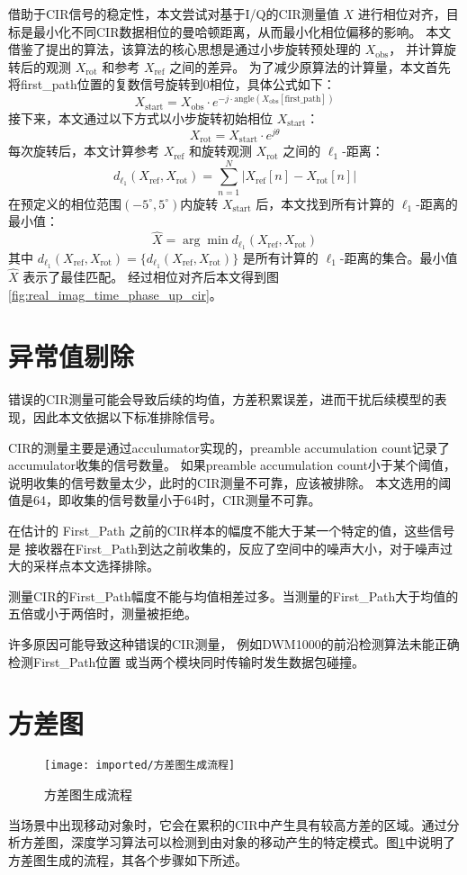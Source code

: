 借助于CIR信号的稳定性，本文尝试对基于I/Q的CIR测量值 \( X \) 进行相位对齐，目标是最小化不同CIR数据相位的曼哈顿距离，从而最小化相位偏移的影响。
本文借鉴了\cite{IQ9452299}提出的算法，该算法的核心思想是通过小步旋转预处理的 \( X_{\text{obs}} \)，
并计算旋转后的观测 \( X_{\text{rot}} \) 和参考 \( X_{\text{ref}} \) 之间的差异。
为了减少原算法的计算量，本文首先将first\_path位置的复数信号旋转到0相位，具体公式如下：
\[
X_{\text{start}} = X_{\text{obs}} \cdot e^{-j \cdot \text{angle}(X_{\text{obs}}[\text{first\_path}])}
\]
接下来，本文通过以下方式以小步旋转初始相位 \( X_{\text{start}} \)：
\[
X_{\text{rot}} = X_{\text{start}} \cdot e^{j\theta}
\]
每次旋转后，本文计算参考 \( X_{\text{ref}} \) 和旋转观测 \( X_{\text{rot}} \) 之间的 \( \ell_1 \)-距离：
\[
d_{\ell_1}(X_{\text{ref}}, X_{\text{rot}}) = \sum_{n=1}^N |X_{\text{ref}}[n] - X_{\text{rot}}[n]|
\]
在预定义的相位范围\((-5^\circ,5^\circ)\)内旋转 \( X_{\text{start}} \) 后，本文找到所有计算的 \( \ell_1 \)-距离的最小值：
\[
\hat{X} = \arg\min d_{\ell_1}(X_{\text{ref}}, X_{\text{rot}})
\]
其中 \( d_{\ell_1}(X_{\text{ref}}, X_{\text{rot}}) = \{d_{\ell_1}(X_{\text{ref}}, X_{\text{rot}})\} \) 是所有计算的 \( \ell_1 \)-距离的集合。最小值 \( \hat{X} \) 表示了最佳匹配。
经过相位对齐后本文得到图\ref{fig:real_imag_time_phase_up_cir}。

\section{异常值剔除}

错误的CIR测量可能会导致后续的均值，方差积累误差，进而干扰后续模型的表现，因此本文依据以下标准排除信号。

CIR的测量主要是通过acculumator实现的，preamble accumulation count记录了accumulator收集的信号数量。
如果preamble accumulation count小于某个阈值，说明收集的信号数量太少，此时的CIR测量不可靠，应该被排除。
本文选用的阈值是64，即收集的信号数量小于64时，CIR测量不可靠。

在估计的 First\_Path 之前的CIR样本的幅度不能大于某一个特定的值，这些信号是
接收器在First\_Path到达之前收集的，反应了空间中的噪声大小，对于噪声过大的采样点本文选择排除。

测量CIR的First\_Path幅度不能与均值相差过多。当测量的First\_Path大于均值的五倍或小于两倍时，测量被拒绝。

许多原因可能导致这种错误的CIR测量，
例如DWM1000的前沿检测算法未能正确检测First\_Path位置
或当两个模块同时传输时发生数据包碰撞。


\section{方差图}
\begin{figure}[htbp]
    \centering
    \texttt{[image: imported/方差图生成流程]}
    \caption{\label{fig:variance_graph_pipline}方差图生成流程}
\end{figure}
当场景中出现移动对象时，它会在累积的CIR中产生具有较高方差的区域。通过分析方差图，深度学习算法可以检测到由对象的移动产生的特定模式。图\ref{fig:variance_graph_pipline}中说明了方差图生成的流程，其各个步骤如下所述。

